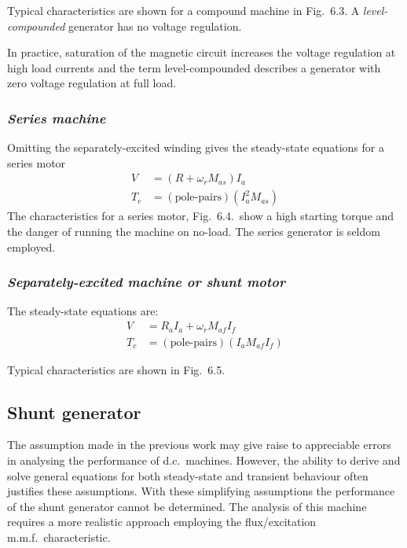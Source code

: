 \documentclass[a4paper,numbers=noenddot,12pt]{scrbook}
\begin{document}
        Typical characteristics are shown for a compound machine in Fig.\ 6.3. A \textit{level-compounded} generator has  no voltage regulation.

        \noindent In practice, saturation of the magnetic circuit increases the voltage regulation at high load currents and the term level-compounded describes a generator with zero voltage regulation at full load.

        \subsubsection{\textit{Series machine}}
        Omitting the separately-excited winding gives the steady-state equations for a series motor
        \begin{align}
            V & = (R + \omega_r M_{as}) I_a\\[2ex]
            T_e & = (\text{pole-pairs})(I_a^2 M_{as})
            \label{}
        \end{align}
        The characteristics for a series motor, Fig.\ 6.4.\ show a high starting torque and the danger of running the machine on no-load. The series generator is seldom employed.

        \subsubsection{\textit{Separately-excited machine or shunt motor}}
        The steady-state equations are:
        \begin{align}
            V & = R_a I_a + \omega_r M_{af} I_f\\[2ex]
            T_e & = (\text{pole-pairs})(I_a M_{af} I_f)
            \label{}
            \label{}
        \end{align}

        Typical characteristics are shown in Fig.\ 6.5.

        \subsection{Shunt generator}
        The assumption made in the previous work may give raise to appreciable errors in analysing the performance of d.c.\ machines. However, the ability to derive and solve general equations for both steady-state and transient behaviour often justifies these assumptions. With these simplifying assumptions the performance of the shunt generator cannot be determined. The analysis of this machine requires a more realistic approach employing the
        flux/excitation m.m.f.\ characteristic.
\end{document}
